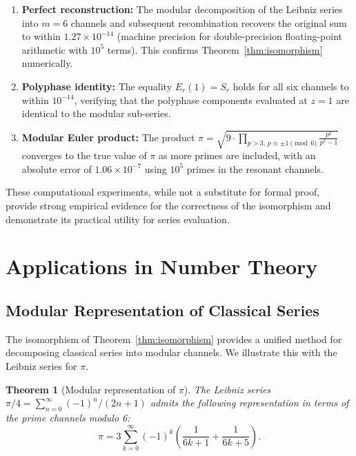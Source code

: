 \documentclass{article}
\theoremstyle{plain}
\newtheorem{theorem}{Theorem}[section]
\theoremstyle{definition}
\theoremstyle{remark}
\begin{document}
\begin{enumerate}
    \item \textbf{Perfect reconstruction:} The modular decomposition of the Leibniz series into \(m=6\) channels and subsequent recombination recovers the original sum to within \(1.27 \times 10^{-14}\) (machine precision for double-precision floating-point arithmetic with \(10^5\) terms). This confirms Theorem~\ref{thm:isomorphism} numerically.
    \item \textbf{Polyphase identity:} The equality \(E_r(1) = S_r\) holds for all six channels to within \(10^{-14}\), verifying that the polyphase components evaluated at \(z=1\) are identical to the modular sub-series.
    \item \textbf{Modular Euler product:} The product \(\pi = \sqrt{9 \cdot \prod_{p > 3, \, p \equiv \pm 1 \pmod{6}} \frac{p^2}{p^2 - 1}}\) converges to the true value of \(\pi\) as more primes are included, with an absolute error of \(1.06 \times 10^{-7}\) using \(10^5\) primes in the resonant channels.
\end{enumerate}

These computational experiments, while not a substitute for formal proof, provide strong empirical evidence for the correctness of the isomorphism and demonstrate its practical utility for series evaluation.

\section{Applications in Number Theory}
\label{sec:numbertheory}

\subsection{Modular Representation of Classical Series}
The isomorphism of Theorem~\ref{thm:isomorphism} provides a unified method for decomposing classical series into modular channels. We illustrate this with the Leibniz series for \(\pi\).

\begin{theorem}[Modular representation of \(\pi\)]
\label{thm:leibniz_mod}
The Leibniz series \(\pi/4 = \sum_{n=0}^{\infty} (-1)^n/(2n+1)\) admits the following representation in terms of the prime channels modulo 6:
\begin{equation}
\pi = 3 \sum_{k=0}^{\infty} (-1)^k \left( \frac{1}{6k+1} + \frac{1}{6k+5} \right).
\label{eq:leibniz_mod}
\end{equation}
\end{theorem}
\end{document}
